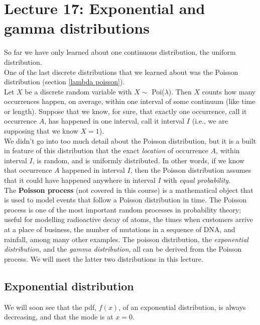 \chapter{Lecture 17: Exponential and gamma distributions}
So far we have only learned about one continuous distribution, the uniform distribution. \\

\noindent One of the last discrete distributions that we learned about was the Poisson distribution (section \ref{lambda poisson}). \\

\noindent Let $X$ be a discrete random variable with $X \sim$ Poi($\lambda$). Then $X$ counts how many occurrences happen, on average, within one interval of some continuum (like time or length). Suppose that we know, for sure, that exactly one occurrence, call it occurrence $A$, has happened in one interval, call it interval $I$ (i.e., we are supposing that we know $X = 1$). \\

\noindent We didn't go into too much detail about the Poisson distribution, but it is a built in feature of this distribution that the exact \textit{location} of occurrence $A$, within interval $I$, is random, and is uniformly distributed. In other words, if we know that occurrence $A$ happened in interval $I$, then the Poisson distribution assumes that it could have happened anywhere in interval $I$ with \textit{equal probability}. \\

\noindent The \textbf{Poisson process} (not covered in this course) is a mathematical object that is used to model events that follow a Poisson distribution in time. The Poisson process is one of the most important random processes in probability theory; useful for modelling radioactive decay of atoms, the times when customers arrive at a place of business, the number of mutations in a sequence of DNA, and rainfall, among many other examples. The poisson distribution, the \textit{exponential distribution}, and the \textit{gamma distribution}, all can be derived from the Poisson process. We will meet the latter two distributions in this lecture.

\section{Exponential distribution} \label{exponential distribution}
We will soon see that the pdf, $f(x)$, of an exponential distribution, is always decreasing, and that the mode is at $x = 0$. \\

